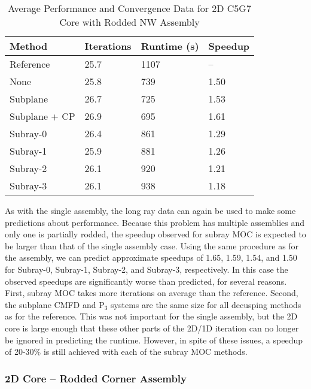 \begin{table}[h]
    \centering
    \caption[2D C5G7 Core Performance Data, Center Assembly]{Average Performance and Convergence Data for 2D C5G7 Core with Rodded NW Assembly}\label{t:subray-performance-2dcoreNW}
    \begin{tabular}{l l l l}\toprule
        Method & Iterations & Runtime (s) & Speedup \\\midrule
Reference     & 25.7 & 1107 & --  \\
None          & 25.8 & 739 & 1.50 \\ 
Subplane      & 26.7 & 725 & 1.53 \\ 
Subplane + CP & 26.9 & 695 & 1.61 \\
Subray-0      & 26.4 & 861 & 1.29 \\ 
Subray-1      & 25.9 & 881 & 1.26 \\ 
Subray-2      & 26.1 & 920 & 1.21 \\ 
Subray-3      & 26.1 & 938 & 1.18 \\ 
        \bottomrule
    \end{tabular}
\end{table}

As with the single assembly, the long ray data can again be used to make some predictions about performance.  Because this problem has multiple assemblies and only one is partially rodded, the speedup observed for subray MOC is expected to be larger than that of the single assembly case.  Using the same procedure as for the assembly, we can predict approximate speedups of 1.65, 1.59, 1.54, and 1.50 for Subray-0, Subray-1, Subray-2, and Subray-3, respectively.  In this case the observed speedups are significantly worse than predicted, for several reasons.  First, subray MOC takes more iterations on average than the reference.  Second, the subplane CMFD and P$_3$ systems are the same size for all decusping methods as for the reference.  This was not important for the single assembly, but the 2D core is large enough that these other parts of the 2D/1D iteration can no longer be ignored in predicting the runtime.  However, in spite of these issues, a speedup of 20-30\% is still achieved with each of the subray MOC methods.

\subsubsection{2D Core -- Rodded Corner Assembly}

